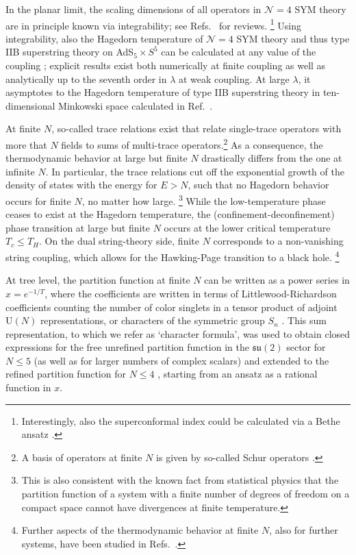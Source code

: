 \documentclass[a4paper,11pt]{article}
\begin{document}
In the planar limit, the scaling dimensions of all operators in $\mathcal{N}=4$ SYM theory are in principle known via integrability; see Refs.\ \cite{Beisert:2010jr,Bombardelli:2016rwb} for reviews.%
\footnote{Interestingly, also the superconformal index could be calculated via a Bethe ansatz \cite{Benini:2018ywd}.}
Using integrability, also the Hagedorn temperature of $\mathcal{N}=4$ SYM theory and thus type IIB superstring theory on AdS${}_5\times S^5$ can be calculated at any value of the coupling \cite{Harmark:2017yrv,Harmark:2018red}; explicit results exist both numerically at finite coupling as well as analytically up to the seventh order in $\lambda$ \cite{talkIGST18,Harmark:2019} at weak coupling. At large $\lambda$, it asymptotes to the Hagedorn temperature of type IIB superstring theory in ten-dimensional Minkowski space \cite{Harmark:2018red} calculated in Ref.\ \cite{Sundborg:1984uk}.


At finite $N$, so-called trace relations exist that relate single-trace operators with more that $N$ fields to sums of multi-trace operators.\footnote{A basis of operators at finite $N$ is given by so-called Schur operators \cite{Corley:2001zk,Brown:2007xh,Bhattacharyya:2008rb}.} 
As a consequence, the thermodynamic behavior at large but finite $N$ drastically differs from the one at infinite $N$.
In particular, the trace relations cut off the exponential growth of the density of states with the energy for $E>N$, such that no Hagedorn behavior occurs for finite $N$, no matter how large.%
\footnote{This is also consistent with the known fact from statistical physics that the partition function of a system with a finite number of degrees of freedom on a compact space cannot have divergences at finite temperature.}
While the low-temperature phase ceases to exist at the Hagedorn temperature, the (confinement-deconfinement) phase transition at large but finite $N$ occurs at the lower critical temperature $T_c\leq T_H$.
On the dual string-theory side, finite $N$ corresponds to a non-vanishing string coupling, which allows for the Hawking-Page transition to a black hole.%
\footnote{Further aspects of the thermodynamic behavior at finite $N$, also for further systems, have been studied in Refs.\ \cite{Thorn:1980iv,Thorn:2015bia,Raha:2017jgv,Curtright:2017pfq,Raha:2019gyr,Hanada:2016pwv,Berenstein:2018lrm,Berenstein:2018hpl,Bergner:2019rca,Hanada:2019czd,Hanada:2019rzv,ArabiArdehali:2019orz,Hanada:2020uvt,Watanabe:2020ufk}.
}


At tree level, the partition function at finite $N$ can be written as a power series in $x=e^{-1/T}$, where the coefficients are written in terms of Littlewood-Richardson coefficients counting the number of color singlets in a tensor product of adjoint $\text{U}(N)$ representations, or characters of the symmetric group $S_n$ \cite{Aharony:2003sx,Dutta:2007ws}.
This sum representation, to which we refer as `character formula', was used to obtain closed expressions for the free unrefined partition function in the $\mathfrak{su}(2)$ sector for $N\leq5$ (as well as for larger numbers of complex scalars) \cite{Harmark:2014mpa} and extended to the refined partition function for $N\leq 4$ \cite{Vardinghus:2015}, starting from an ansatz as a rational function in $x$.
\end{document}

